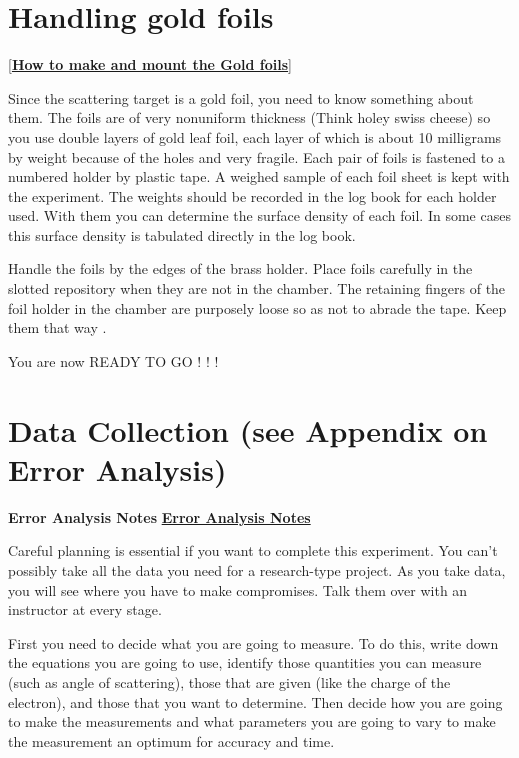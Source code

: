 \documentclass{../lab}
\begin{document}
\section{Handling gold foils}

[\href{http://physics111.lib.berkeley.edu/Physics111/Reprints/RUT/Procedure\%20for\%20Making\%20Foils.pdf}{\textbf{How to make and mount the Gold foils}}]

Since the scattering target is a gold foil, you need to know something about them. The foils are of very nonuniform thickness (Think holey swiss cheese) so you use double layers of gold leaf foil, each layer of which is about 10 milligrams by weight because of the holes and very fragile. Each pair of foils is fastened to a numbered holder by plastic tape. A weighed sample of each foil sheet is kept with the experiment. The weights should be recorded in the log book for each holder used. With them you can determine the surface density of each foil. In some cases this surface density is tabulated directly in the log book.

Handle the foils by the edges of the brass holder. Place foils carefully in the slotted repository when they are not in the chamber. The retaining fingers of the foil holder in the chamber are purposely loose so as not to abrade the tape. Keep them that way .

You are now READY TO GO ! ! !

\section{Data Collection (see Appendix on Error Analysis)}

\textbf{Error Analysis Notes} \href{http://experimentationlab.berkeley.edu/EAX}{\textbf{Error Analysis Notes}}

Careful planning is essential if you want to complete this experiment. You can't possibly take all the data you need for a research-type project. As you take data, you will see where you have to make compromises. Talk them over with an instructor at every stage.

First you need to decide what you are going to measure. To do this, write down the equations you are going to use, identify those quantities you can measure (such as angle of scattering), those that are given (like the charge of the electron), and those that you want to determine. Then decide how you are going to make the measurements and what parameters you are going to vary to make the measurement an optimum for accuracy and time.
\end{document}

